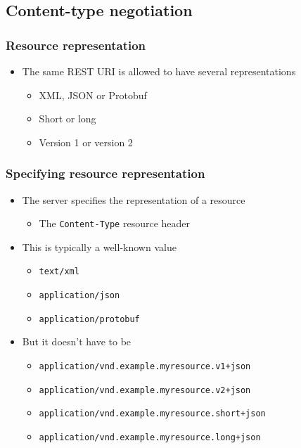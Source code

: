 \documentclass[8pt]{article}
\begin{document}
\subsection{Content-type negotiation}
\label{sec:orgda30436}
\subsubsection{Resource representation}
\label{sec:org9acd48c}
\begin{itemize}
\item The same REST URI is allowed to have several representations
\begin{itemize}
\item XML, JSON or Protobuf
\item Short or long
\item Version 1 or version 2
\end{itemize}
\end{itemize}
\subsubsection{Specifying resource representation}
\label{sec:orgefd6a20}
\begin{itemize}
\item The server specifies the representation of a resource
\begin{itemize}
\item The \texttt{Content-Type} resource header
\end{itemize}
\item This is typically a well-known value
\begin{itemize}
\item \texttt{text/xml}
\item \texttt{application/json}
\item \texttt{application/protobuf}
\end{itemize}
\item But it doesn't have to be
\begin{itemize}
\item \texttt{application/vnd.example.myresource.v1+json}
\item \texttt{application/vnd.example.myresource.v2+json}
\item \texttt{application/vnd.example.myresource.short+json}
\item \texttt{application/vnd.example.myresource.long+json}
\end{itemize}
\end{itemize}
\end{document}

